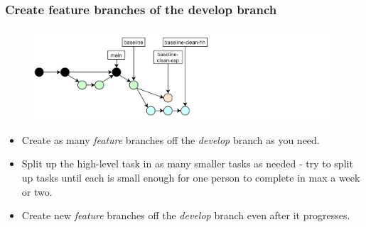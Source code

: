 \documentclass[aspectratio=169]{beamer}
\begin{document}
\begin{frame}
	\frametitle{Create feature branches of the develop branch}

	\vspace{-.5cm}
	\begin{minipage}[t][5cm][t]{\textwidth}
		\begin{figure}
			\centering
			\includegraphics[width=\textwidth]{./img/dime-gitflow-network-2-2.png}
		\end{figure}
	\end{minipage}

	\vspace{-.5cm}
	\begin{minipage}[t][5cm][t]{\textwidth}
		\begin{itemize}
			\setlength\itemsep{.5em}
			\item Create as many \textit{feature} branches off
			the \textit{develop} branch as you need.
			\item Split up the high-level task in as many smaller tasks as needed
			- try to split up tasks until each is small enough
			for one person to complete in max a week or two.
			\item Create new \textit{feature} branches off
			the \textit{develop} branch even after it progresses.
		\end{itemize}
	\end{minipage}
\end{frame}
\end{document}
